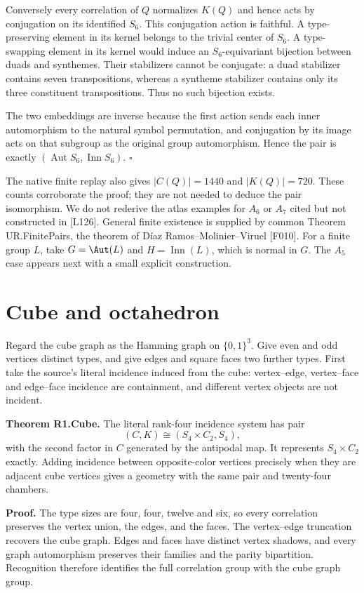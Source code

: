 Conversely every correlation of \(Q\) normalizes \(K(Q)\) and hence acts
by conjugation on its identified \(S_6\). This conjugation action is
faithful. A type-preserving element in its kernel belongs to the trivial
center of \(S_6\). A type-swapping element in its kernel would induce an
\(S_6\)-equivariant bijection between duads and synthemes. Their
stabilizers cannot be conjugate: a duad stabilizer contains seven
transpositions, whereas a syntheme stabilizer contains only its three
constituent transpositions. Thus no such bijection exists.

The two embeddings are inverse because the first action sends each inner
automorphism to the natural symbol permutation, and conjugation by its
image acts on that subgroup as the original group automorphism. Hence
the pair is exactly \((\operatorname{Aut}S_6,\operatorname{Inn}S_6)\).
\(\square\)

The native finite replay also gives \(|C(Q)|=1440\) and \(|K(Q)|=720\).
These counts corroborate the proof; they are not needed to deduce the
pair isomorphism. We do not rederive the atlas examples for \(A_6\) or
\(A_7\) cited but not constructed in {[}L126{]}. General finite
existence is supplied by common Theorem UR.FinitePairs, the theorem of
D\'iaz Ramos--Molinier--Viruel [F010]. For a finite group $L$, take
$G=\Aut(L)$ and $H=\operatorname{Inn}(L)$, which is normal in $G$.
The \(A_5\) case appears next with a small explicit construction.

\section{Cube and octahedron}\label{cube-and-octahedron}

Regard the cube graph as the Hamming graph on \(\{0,1\}^3\). Give even
and odd vertices distinct types, and give edges and square faces two
further types. First take the source's literal incidence induced from
the cube: vertex--edge, vertex--face and edge--face incidence are
containment, and different vertex objects are not incident.

\textbf{Theorem R1.Cube.} The literal rank-four incidence system has
pair \[
(C,K)\cong(S_4\times C_2,S_4),
\tag{C1}
\] with the second factor in \(C\) generated by the antipodal map. It
represents \(S_4\times C_2\) exactly. Adding incidence between
opposite-color vertices precisely when they are adjacent cube vertices
gives a geometry with the same pair and twenty-four chambers.

\textbf{Proof.} The type sizes are four, four, twelve and six, so every
correlation preserves the vertex union, the edges, and the faces. The
vertex--edge truncation recovers the cube graph. Edges and faces have
distinct vertex shadows, and every graph automorphism preserves their
families and the parity bipartition. Recognition therefore identifies
the full correlation group with the cube graph group.


